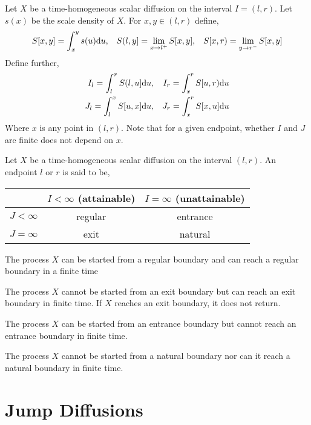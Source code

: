 \documentclass[12pt]{article}
\begin{document}
\begin{definition}
    Let \( X \) be a time-homogeneous scalar diffusion on the interval \( I = (l,r) \). Let \( s(x) \) be the scale density of \( X \).
For \( x,y\in (l,r) \) define,
\begin{align*}
    S[x,y] = \int_x^y s(u)\mathrm{d} u
    ,&&
    S(l,y] = \lim_{x\to l^+} S[x,y]
    ,&&
    S[x,r) = \lim_{y\to r^-} S[x,y]
\end{align*}
Define further,
\begin{align*}
    I_l = \int_l^r S(l,u] \mathrm{d} u, && I_r = \int_x^r S[u,r)\mathrm{d} u \\
    J_l = \int_l^x S[u,x] \mathrm{d} u, && J_r = \int_x^r S[x,u]\mathrm{d} u
\end{align*}
Where \( x \) is any point in \( (l,r) \). Note that for a given endpoint, whether \( I \) and \( J \) are finite does not depend on \( x \).
\end{definition}


\begin{definition}
Let \( X \) be a time-homogeneous scalar diffusion on the interval \( (l,r) \). An endpoint \( l \) or \( r \) is said to be,

\begin{table}[H]\centering
\begin{tabular}{r|cc}
    & \( I < \infty \) (attainable) & \( I = \infty \) (unattainable) \\ \hline
    \( J < \infty \) & regular & entrance \\
    \( J=\infty \) & exit & natural
\end{tabular}
\end{table}
\end{definition}

The process \( X \) can be started from a regular boundary and can reach a regular boundary in a finite time

The process \( X \) cannot be started from an exit boundary but can reach an exit boundary in finite time. If \( X \) reaches an exit boundary, it does not return.

The process \( X \) can be started from an entrance boundary but cannot reach an entrance boundary in finite time.

The process \( X \) cannot be started from a natural boundary nor can it reach a natural boundary in finite time.

\section{Jump Diffusions}
\end{document}
